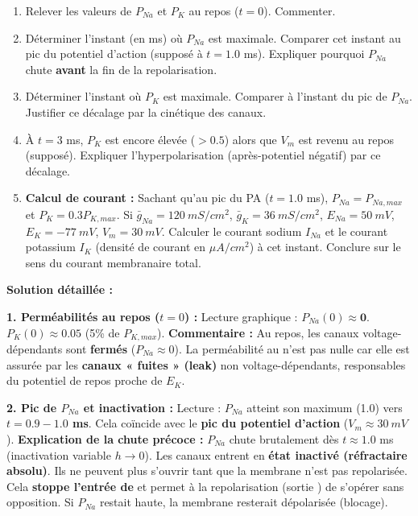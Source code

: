 \documentclass[11pt]{article}
\begin{document}
\begin{exoresolu}
\begin{enumerate}
    \item Relever les valeurs de $P_{Na}$ et $P_K$ au repos ($t=0$). Commenter.
    \item Déterminer l'instant (en ms) où $P_{Na}$ est maximale. Comparer cet instant au pic du potentiel d'action (supposé à $t=1.0$ ms). Expliquer pourquoi $P_{Na}$ chute \textbf{avant} la fin de la repolarisation.
    \item Déterminer l'instant où $P_K$ est maximale. Comparer à l'instant du pic de $P_{Na}$. Justifier ce décalage par la cinétique des canaux.
    \item À $t = 3$ ms, $P_K$ est encore élevée ($> 0.5$) alors que $V_m$ est revenu au repos (supposé). Expliquer l'hyperpolarisation (après-potentiel négatif) par ce décalage.
    \item \textbf{Calcul de courant :} Sachant qu'au pic du PA ($t=1.0$ ms), $P_{Na} = P_{Na,max}$ et $P_K = 0.3 P_{K,max}$. Si $\bar{g}_{Na} = \SI{120}{mS/cm^2}$, $\bar{g}_K = \SI{36}{mS/cm^2}$, $E_{Na} = \SI{+50}{mV}$, $E_K = \SI{-77}{mV}$, $V_m = \SI{+30}{mV}$. Calculer le courant sodium $I_{Na}$ et le courant potassium $I_K$ (densité de courant en $\mu A/cm^2$) à cet instant. Conclure sur le sens du courant membranaire total.
\end{enumerate}

\tcblower
\textbf{Solution détaillée :}

\textbf{1. Perméabilités au repos ($t=0$) :}
Lecture graphique : $P_{Na}(0) \approx \mathbf{0}$. $P_K(0) \approx \mathbf{0.05}$ (5\% de $P_{K,max}$).
\textbf{Commentaire :} Au repos, les canaux  voltage-dépendants sont \textbf{fermés} ($P_{Na} \approx 0$). La perméabilité au  n'est pas nulle car elle est assurée par les \textbf{canaux  « fuites » (leak)} non voltage-dépendants, responsables du potentiel de repos proche de $E_K$.

\textbf{2. Pic de $P_{Na}$ et inactivation :}
Lecture : $P_{Na}$ atteint son maximum (1.0) vers \textbf{$t = 0.9 - 1.0$ ms}. Cela coïncide avec le \textbf{pic du potentiel d'action} ($V_m \approx \SI{+30}{mV}$).
\textbf{Explication de la chute précoce :} $P_{Na}$ chute brutalement dès $t \approx 1.0$ ms (inactivation variable $h \to 0$). Les canaux  entrent en \textbf{état inactivé (réfractaire absolu)}. Ils ne peuvent plus s'ouvrir tant que la membrane n'est pas repolarisée. Cela \textbf{stoppe l'entrée de } et permet à la repolarisation (sortie ) de s'opérer sans opposition. Si $P_{Na}$ restait haute, la membrane resterait dépolarisée (blocage).


\end{exoresolu}
\end{document}
